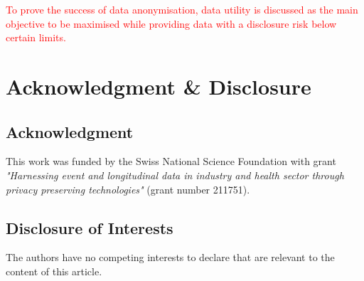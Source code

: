 \documentclass{article}
\begin{document}
\textcolor{red}{To prove the success of data anonymisation, data utility is discussed as the main objective to be maximised while providing data with a disclosure risk below certain limits.}

\section*{Acknowledgment \& Disclosure} 
\subsection*{Acknowledgment} 
This work was funded by the Swiss National Science
Foundation with grant \textit{"Harnessing event and longitudinal data in industry and health sector through privacy preserving technologies"} (grant number 211751).

\subsection*{Disclosure of Interests} 
The authors have no competing interests to declare that are
relevant to the content of this article. 




\end{document}
